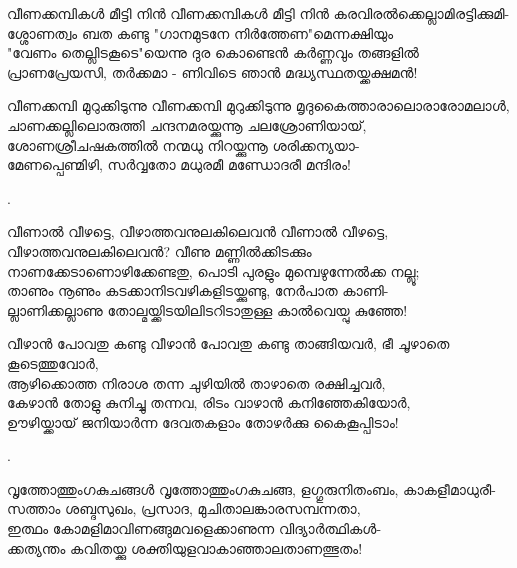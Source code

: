 \begin{enumerate}
\begin{slokam}{\VSv}{\VNM}{വീണക്കമ്പികള്‍ മീട്ടി നിൻ}
 വീണക്കമ്പികള്‍ മീട്ടി നിൻ കരവിരൽക്കെല്ലാമിരട്ടിക്കുമി-\\
ശ്ശോണത്വം ബത കണ്ടു "ഗാനമുടനേ നിർത്തേണ"മെന്നക്ഷിയും\\
"വേണം തെല്ലിടകൂടെ"യെന്നു ദുര കൊണ്ടെൻ കർണ്ണവും തങ്ങളിൽ\\
പ്രാണപ്രേയസി, തർക്കമാ - ണിവിടെ ഞാൻ മദ്ധ്യസ്ഥതയ്ക്കക്ഷമൻ!
\end{slokam}




\begin{slokam}{\VSv}{\VNM}{വീണക്കമ്പി മുറുക്കിടുന്നു}
വീണക്കമ്പി മുറുക്കിടുന്നു മൃദുകൈത്താരാലൊരാരോമലാള്‍,\\
ചാണക്കല്ലിലൊരുത്തി ചന്ദനമരയ്ക്കുന്നൂ ചലശ്രോണിയായ്‌,\\
ശോണശ്രീചഷകത്തിൽ നന്മധു നിറയ്ക്കുന്നൂ ശരിക്കന്യയാ-\\
മേണപ്പെണ്മിഴി, സർവ്വതോ മധുരമീ മണ്ഡോദരീ മന്ദിരം!
\end{slokam}


.


\begin{slokam}{\VSr}{\VKG}{വീണാൽ വീഴട്ടെ, വീഴാത്തവനുലകിലെവൻ}
വീണാൽ വീഴട്ടെ, വീഴാത്തവനുലകിലെവൻ?  വീണു മണ്ണിൽക്കിടക്കും \\
നാണക്കേടാണൊഴിക്കേണ്ടതു, പൊടി പുരളും മുമ്പെഴുന്നേൽക്ക നല്ലൂ; \\
താണും നൂണും കടക്കാനിടവഴികളിടയ്ക്കുണ്ടു, നേർപാത കാണി-\\
ല്ലാണിക്കല്ലാണു തോല്മയ്ക്കിടയിലിടറിടാതുള്ള കാൽവെയ്പു കുഞ്ഞേ!
\end{slokam}



\begin{slokam}{\VSv}{\UN}{വീഴാൻ പോവതു കണ്ടു}
വീഴാൻ പോവതു കണ്ടു  താങ്ങിയവർ, ഭീ ചൂഴാതെ കൂടെത്തുവോർ,\\
ആഴിക്കൊത്ത നിരാശ തന്ന ചുഴിയിൽ താഴാതെ രക്ഷിച്ചവർ,\\
കേഴാൻ തോളു കുനിച്ചു  തന്നവ, രിടം വാഴാൻ കനിഞ്ഞേകിയോർ,\\
ഊഴിയ്ക്കായ് ജനിയാർന്ന ദേവതകളാം തോഴർക്കു കൈകൂപ്പിടാം!
\end{slokam}

.


\begin{slokam}{\VSv}{\VKG}{വൃത്തോത്തുംഗകുചങ്ങൾ}
 വൃത്തോത്തുംഗകുചങ്ങ, ളഗ്ഗുരുനിതംബം, കാകളീമാധുരീ-\\
സത്താം ശബ്ദസുഖം, പ്രസാദ, മുചിതാലങ്കാരസമ്പന്നതാ,\\
ഇത്ഥം കോമളിമാവിണങ്ങുമവളെക്കാണുന്ന വിദ്യാർത്ഥികള്‍-\\
ക്കത്യന്തം കവിതയ്ക്കു ശക്തിയുളവാകാഞ്ഞാലതാണത്ഭുതം!
\end{slokam}


\end{enumerate}
